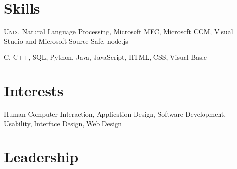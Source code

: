 \documentclass[margin,line,oneside,a4paper]{resume}
\begin{document}
\begin{resume}
   \section{\mysidestyle Skills}

   \begin{list2}
   \item \textsc{Unix}, Natural Language Processing, Microsoft MFC, Microsoft COM, Visual Studio and Microsoft Source Safe, node.js
   \item C, C++, SQL, Python, Java, JavaScript, HTML, CSS, Visual Basic
   \end{list2}

   \section{\mysidestyle Interests}

   \begin{list2}
   \item Human-Computer Interaction, Application Design, Software Development, Usability, Interface Design, Web Design
   \end{list2}

   \section{\mysidestyle Leadership}

   \vspace{-4mm}\\\vspace{1mm}

\end{resume}
\end{document}
